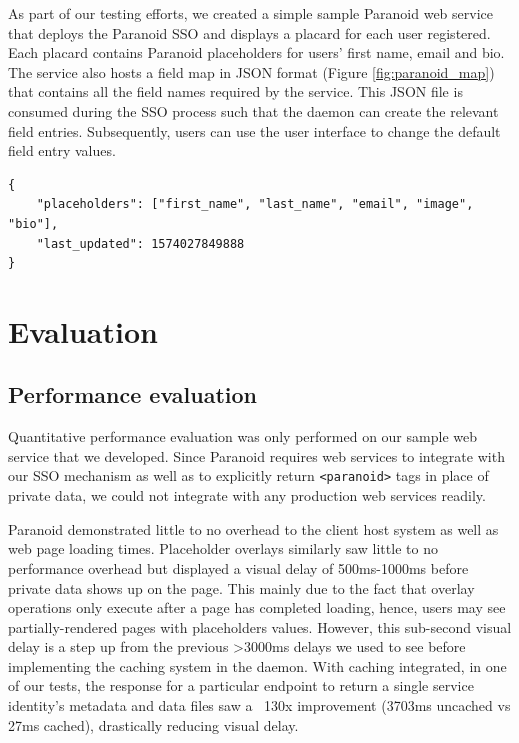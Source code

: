 \documentclass[letterpaper,twocolumn,10pt]{article}
\begin{document}
As part of our testing efforts, we created a simple sample Paranoid web service that deploys the Paranoid SSO and displays a placard for each user registered. Each placard contains Paranoid placeholders for users' first name, email and bio. The service also hosts a field map in JSON format (Figure \ref{fig:paranoid_map}) that contains all the field names required by the service. This JSON file is consumed during the SSO process such that the daemon can create the relevant field entries. Subsequently, users can use the user interface to change the default field entry values.

\begin{center}
    \begin{lstlisting}
{
    "placeholders": ["first_name", "last_name", "email", "image", "bio"],
    "last_updated": 1574027849888
}
    \end{lstlisting}
    \label{fig:paranoid_map}
\end{center}

\section{Evaluation}

\subsection{Performance evaluation}

Quantitative performance evaluation was only performed on our sample web service that we developed. Since Paranoid requires web services to integrate with our SSO mechanism as well as to explicitly return \texttt{<paranoid>} tags in place of private data, we could not integrate with any production web services readily.

Paranoid demonstrated little to no overhead to the client host system as well as web page loading times. Placeholder overlays similarly saw little to no performance overhead but displayed a visual delay of 500ms-1000ms before private data shows up on the page. This mainly due to the fact that overlay operations only execute after a page has completed loading, hence, users may see partially-rendered pages with placeholders values. However, this sub-second visual delay is a step up from the previous >3000ms delays we used to see before implementing the caching system in the daemon. With caching integrated, in one of our tests, the response for a particular endpoint to return a single service identity's metadata and data files saw a ~130x improvement (3703ms uncached vs 27ms cached), drastically reducing visual delay.
\end{document}
